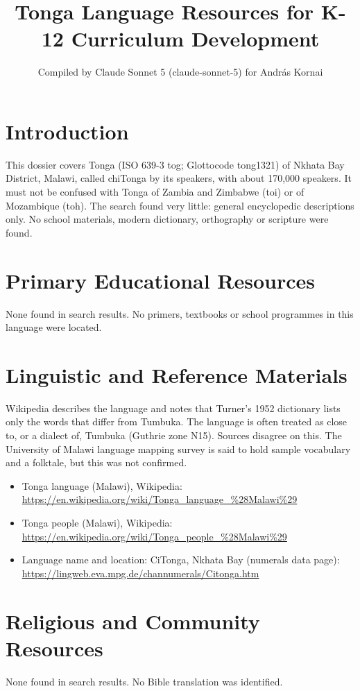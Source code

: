 \documentclass[12pt]{article}
\title{Tonga Language Resources for K-12 Curriculum Development}
\author{Compiled by Claude Sonnet 5 (claude-sonnet-5) for Andr\'as Kornai}
\date{}
\begin{document}
\maketitle

\section{Introduction}
This dossier covers Tonga (ISO 639-3 tog; Glottocode tong1321) of Nkhata Bay District, Malawi, called chiTonga by its speakers, with about 170,000 speakers. It must not be confused with Tonga of Zambia and Zimbabwe (toi) or of Mozambique (toh). The search found very little: general encyclopedic descriptions only. No school materials, modern dictionary, orthography or scripture were found.

\section{Primary Educational Resources}
None found in search results. No primers, textbooks or school programmes in this language were located.

\section{Linguistic and Reference Materials}
Wikipedia describes the language and notes that Turner's 1952 dictionary lists only the words that differ from Tumbuka. The language is often treated as close to, or a dialect of, Tumbuka (Guthrie zone N15). Sources disagree on this. The University of Malawi language mapping survey is said to hold sample vocabulary and a folktale, but this was not confirmed.
\begin{itemize}
\item Tonga language (Malawi), Wikipedia: \url{https://en.wikipedia.org/wiki/Tonga_language_%28Malawi%29}
\item Tonga people (Malawi), Wikipedia: \url{https://en.wikipedia.org/wiki/Tonga_people_%28Malawi%29}
\item Language name and location: CiTonga, Nkhata Bay (numerals data page): \url{https://lingweb.eva.mpg.de/channumerals/Citonga.htm}
\end{itemize}

\section{Religious and Community Resources}
None found in search results. No Bible translation was identified.
\end{document}
